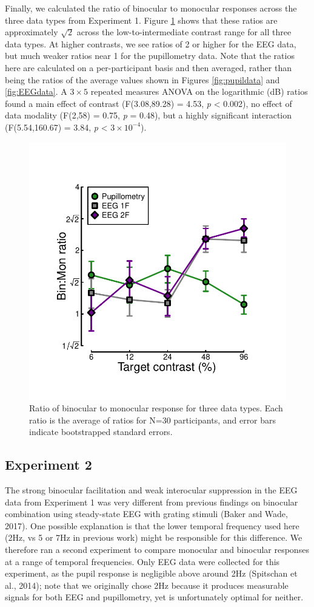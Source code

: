 \documentclass[
]{article}
\begin{document}
Finally, we calculated the ratio of binocular to monocular responses across the three data types from Experiment 1. Figure \ref{fig:BSratios} shows that these ratios are approximately \(\sqrt2\) across the low-to-intermediate contrast range for all three data types. At higher contrasts, we see ratios of 2 or higher for the EEG data, but much weaker ratios near 1 for the pupillometry data. Note that the ratios here are calculated on a per-participant basis and then averaged, rather than being the ratios of the average values shown in Figures \ref{fig:pupildata} and \ref{fig:EEGdata}. A \(3 \times 5\) repeated measures ANOVA on the logarithmic (dB) ratios found a main effect of contrast (F(3.08,89.28) = 4.53, \emph{p} \textless{} 0.002), no effect of data modality (F(2,58) = 0.75, \emph{p} = 0.48), but a highly significant interaction (F(5.54,160.67) = 3.84, \emph{p} \textless{} \ensuremath{3\times 10^{-4}}).

\begin{figure}

{\centering \includegraphics[width=0.5\linewidth]{Figures/BSratios} 

}

\caption{Ratio of binocular to monocular response for three data types. Each ratio is the average of ratios for N=30 participants, and error bars indicate bootstrapped standard errors.}\label{fig:BSratios}
\end{figure}

\hypertarget{experiment-2}{%
\subsection{Experiment 2}\label{experiment-2}}

The strong binocular facilitation and weak interocular suppression in the EEG data from Experiment 1 was very different from previous findings on binocular combination using steady-state EEG with grating stimuli (Baker and Wade, 2017). One possible explanation is that the lower temporal frequency used here (2Hz, vs 5 or 7Hz in previous work) might be responsible for this difference. We therefore ran a second experiment to compare monocular and binocular responses at a range of temporal frequencies. Only EEG data were collected for this experiment, as the pupil response is negligible above around 2Hz (Spitschan et al., 2014); note that we originally chose 2Hz because it produces measurable signals for both EEG and pupillometry, yet is unfortunately optimal for neither.
\end{document}
